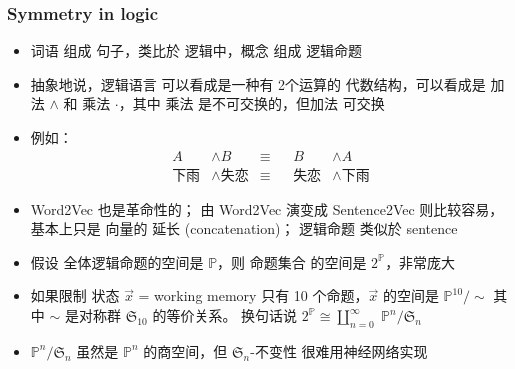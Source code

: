 \documentclass[16pt]{beamer}
\newcommand{\emp}[1]{{\color{violet}#1}}
\begin{document}
\begin{frame}
\frametitle{Symmetry in logic}
\begin{itemize}
	\item \emp{词语} 组成 \emp{句子}，类比於 逻辑中，\emp{概念} 组成 \emp{逻辑命题}
	
	\item 抽象地说，逻辑语言 可以看成是一种有 2个运算的 \emp{代数结构}，可以看成是 加法 $\wedge$ 和 乘法 $\cdot$，其中 乘法 是不可交换的，但加法 可交换
	
	\item 例如：
	\begin{equation}
	\begin{aligned}
	A &\wedge B & \equiv && B & \wedge A \\
	\mbox{下雨} &\wedge \mbox{失恋} & \equiv && \mbox{失恋} &\wedge \mbox{下雨}
	\end{aligned}
	\end{equation}
	
	\item Word2Vec 也是革命性的； 由 Word2Vec 演变成 Sentence2Vec 则比较容易，基本上只是 向量的 \emp{延长} (concatenation)； 逻辑命题 类似於 sentence
	
	\item 假设 全体逻辑命题的空间是 $\mathbb{P}$，则 \emp{命题集合} 的空间是 $2^{\mathbb{P}}$，非常庞大
	
	\item 如果限制 状态 $\vec{x}$ = working memory 只有 10 个命题，$\vec{x}$ 的空间是 $\mathbb{P}^{10}/\sim$ 其中 $\sim$ 是对称群 $\mathfrak{S}_{10}$ 的等价关系。 换句话说 $ 2^{\mathbb{P}} \cong \coprod_{n=0}^{\infty} \; \mathbb{P}^n / \mathfrak{S}_n $
	
	\item $\mathbb{P}^n / \mathfrak{S}_n$ 虽然是 $\mathbb{P}^n$ 的商空间，但 $\mathfrak{S}_n$-不变性 很难用神经网络实现
	
	
\end{itemize}
\end{frame}
\end{document}
